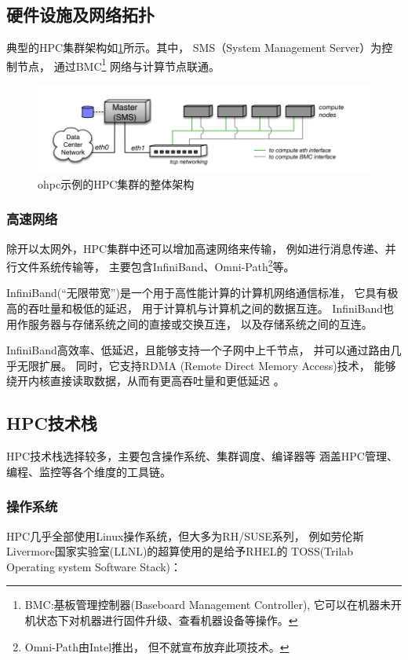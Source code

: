 \subsection{硬件设施及网络拓扑}
典型的HPC集群架构如\cref{hpc_structure}所示。其中，
SMS（System Management Server）为控制节点，
通过BMC\footnote{BMC:基板管理控制器(Baseboard Management Controller),
它可以在机器未开机状态下对机器进行固件升级、查看机器设备等操作。}
网络与计算节点联通。

\begin{figure}[ht!]
    \centering
    \includegraphics[width=\linewidth]{images/hpc-cluster-structure.png}
    \caption{ohpc示例的HPC集群的整体架构\cite{ohpc}}
    \label{hpc_structure}
\end{figure}

\subsubsection{高速网络}
除开以太网外，HPC集群中还可以增加高速网络来传输，
例如进行消息传递、并行文件系统传输等，
主要包含InfiniBand、Omni-Path\footnote{Omni-Path由Intel推出，
但不就宣布放弃此项技术\cite{wiki_omni_path}。}等。

InfiniBand(“无限带宽”)是一个用于高性能计算的计算机网络通信标准，
它具有极高的吞吐量和极低的延迟，
用于计算机与计算机之间的数据互连。
InfiniBand也用作服务器与存储系统之间的直接或交换互连，
以及存储系统之间的互连\cite{wiki_infiniband}。

InfiniBand高效率、低延迟，且能够支持一个子网中上千节点，
并可以通过路由几乎无限扩展。
同时，它支持RDMA (Remote Direct Memory Access)技术，
能够绕开内核直接读取数据，从而有更高吞吐量和更低延迟
\cite{infiniband_future,wiki_rdma,infiniband_eth}。

\subsection{HPC技术栈}
HPC技术栈选择较多，主要包含操作系统、集群调度、编译器等
涵盖HPC管理、编程、监控等各个维度的工具链。

\subsubsection{操作系统}
HPC几乎全部使用Linux操作系统，但大多为RH/SUSE系列，
例如劳伦斯Livermore国家实验室(LLNL)的超算使用的是给予RHEL的
TOSS(Trilab Operating system Software Stack)：

